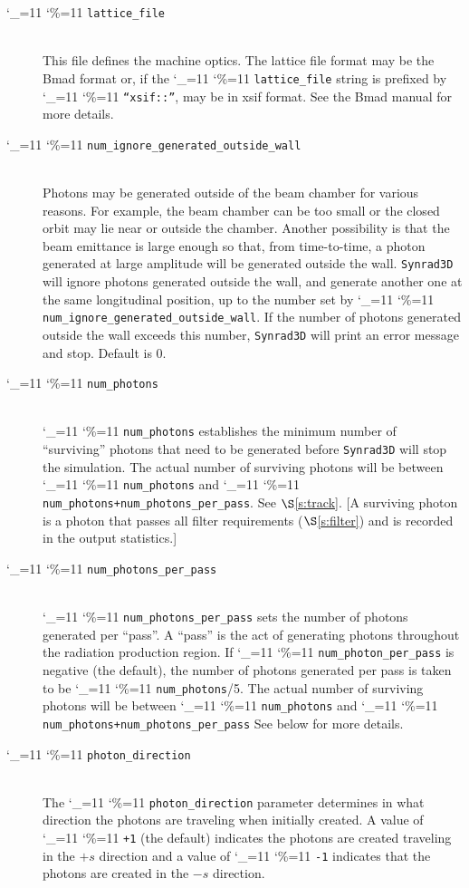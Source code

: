 \documentclass[11pt,openany]{report}
\newcommand{\sref}[1]{$\S$\ref{#1}}
\newcommand{\srthree}{\texttt{Synrad3D}\xspace}
\newcommand\ttcmd{\begingroup\catcode`\_=11 \catcode`\%=11 \dottcmd}
\newcommand\dottcmd[1]{\texttt{#1}\endgroup}
\newcommand{\vn}{\ttcmd}
\newcommand{\Newline}{\hfil \\}
\begin{document}
\begin{description}
  \item[\vn{lattice_file}] \Newline
This file defines the machine optics. The lattice file format may be
the Bmad format or, if the \vn{lattice_file} string is prefixed by
\vn{``xsif::''}, may be in xsif format. See the Bmad manual for more details.

  \item[\vn{num_ignore_generated_outside_wall}] \Newline
Photons may be generated outside of the beam chamber for various
reasons. For example, the beam chamber can be too small or the closed
orbit may lie near or outside the chamber. Another possibility is that
the beam emittance is large enough so that, from time-to-time, a
photon generated at large amplitude will be generated outside the
wall. \srthree will ignore photons generated outside the wall, and
generate another one at the same longitudinal position, up to the
number set by \vn{num_ignore_generated_outside_wall}. If the number of
photons generated outside the wall exceeds this number, \srthree will
print an error message and stop. Default is 0. 

  \item[\vn{num_photons}] \Newline
\vn{num_photons} establishes the minimum number of ``surviving'' photons that need to be generated
before \srthree will stop the simulation. The actual number of surviving photons will be between
\vn{num_photons} and \vn{num_photons+num_photons_per_pass}. See \sref{s:track}. [A surviving photon
is a photon that passes all filter requirements (\sref{s:filter}) and is recorded in the output
statistics.]

  \item[\vn{num_photons_per_pass}] \Newline
\vn{num_photons_per_pass} sets the number of photons generated per
``pass''.  A ``pass'' is the act of generating photons throughout the
radiation production region. If \vn{num_photon_per_pass} is negative
(the default), the number of photons generated per pass is taken
to be \vn{num_photons}/5. The actual number of surviving photons will be between
\vn{num_photons} and \vn{num_photons+num_photons_per_pass} See
below for more details. 

  \item[\vn{photon_direction}] \Newline
The \vn{photon_direction} parameter determines in what direction the photons
are traveling when initially created. A value of \vn{+1} (the default) indicates the photons
are created traveling in the $+s$ direction and a value of \vn{-1} indicates
that the photons are created in the $-s$ direction.


\end{description}
\end{document}
